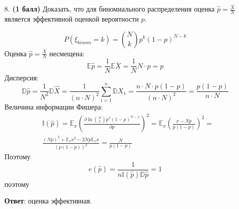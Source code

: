 \documentclass{assignment}
\begin{document}
\begin{enumerate}
    \item[8.] \textbf{(1 балл)} Доказать, что для биномиального распределения оценка $\displaystyle \hat{p} = \frac{\bar{X}}{N}$ является эффективной оценкой вероятности $p$.

    $$P(\xi_{binom} = k) = \binom{N}{k} p^{k}(1 - p)^{N - k}$$
    \newline
    \start
    Оценка $\hat{p} = \frac{\bar{X}}{N}$ несмещена:
    \begin{equation}
        \mathbb{E}\hat{p} = \frac{1}{N}\mathbb{E}\bar{X} = \frac{1}{N}N\cdot p = p
    \end{equation}
    Дисперсия:
    \begin{equation}
        \mathbb{D}\hat{p} = \frac{1}{N^2}\mathbb{D}\hat{X} = \frac{1}{(n\cdot N)^2}\sum_{i=1}^{n}\mathbb{D}X_1 = \frac{n\cdot N\cdot p(1-p)}{(n\cdot N)^2} = \frac{p(1-p)}{n\cdot N}
    \end{equation}
    Величина информации Фишера:
    \begin{align*}
        &\mathbb{I}(\hat{p}) = \mathbb{E}_x(\frac{\partial \ln \binom{N}{k}p^x (1-p)^{N-x}}{\partial p})^2 = \mathbb{E}_x(\frac{x-Np}{p(1-p)})^2 = \\
        &\frac{(Np)^2+\mathbb{E}_xx^2-2Np\mathbb{E}_xx}{(p(1-p))^2} = \frac{N}{p(1-p)}
    \end{align*}
    Поэтому
    \begin{equation}
        e(\hat{p}) = \frac{1}{n\mathbb{I}(\hat{p})\mathbb{D}\hat{p}} = 1
    \end{equation}
    поэтому

    \textbf{Ответ}: оценка эффективная.
    \finish





\end{enumerate}
\end{document}
